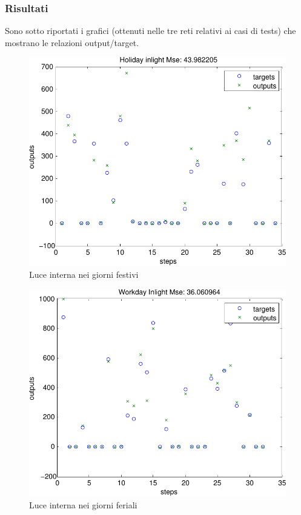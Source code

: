 \subsubsection{Risultati}


Sono sotto riportati i grafici (ottenuti nelle tre reti relativi ai casi di tests) che mostrano le relazioni output/target.

\begin{figure}[htbp]
  \centering
  \includegraphics[scale=0.5]{images/anfis/holiday/inlight.pdf}
  \caption{Luce interna nei giorni festivi}
\end{figure}

\begin{figure}[htbp]
  \centering
  \includegraphics[scale=0.5]{images/anfis/workday/inlight.pdf}
  \caption{Luce interna nei giorni feriali}
\end{figure}

